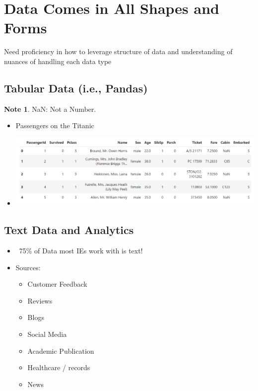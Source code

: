 \documentclass[11pt]{article}
\theoremstyle{definition}
\newtheorem{note}{Note}
\begin{document}
\section{Data Comes in All Shapes and Forms}
Need proficiency in how to leverage structure of data and understanding of nuances of handling each data type
\subsection{Tabular Data (i.e., Pandas)}
\begin{note}
  NaN: Not a Number.
\end{note}
  \begin{itemize}
    \item Passengers on the Titanic
    \item \includegraphics[width = \textwidth - 27.37506pt]{6.png}
  \end{itemize}
\subsection{Text Data and Analytics}
\begin{itemize}
  \item ~75\% of Data most IEs work with is text!
  \item Sources:
  \begin{itemize}
    \item Customer Feedback
    \item Reviews
    \item Blogs
    \item Social Media
    \item Academic Publication
    \item Healthcare / records
    \item News
  \end{itemize}
\end{itemize}
\end{document}
